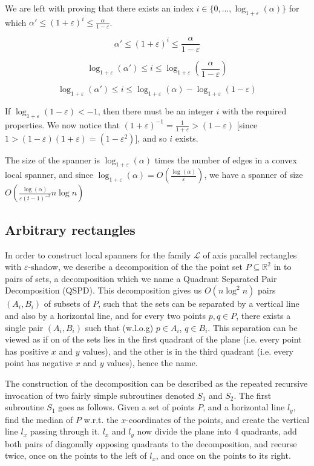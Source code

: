 \documentclass{article}
\newcommand{\eps}{\varepsilon}
\newcommand{\R}{\mathbb{R}}
\newcommand{\LL}{\mathcal{L}}
\begin{document}
	We are left with proving that there exists an index $i\in \{0,...,\log_{1+\eps}(\alpha)\}$ for which $\alpha' \leq (1+\eps)^i \leq \frac{\alpha}{1-\eps}$.
	
	$$\alpha' \leq (1+\eps)^i \leq \frac{\alpha}{1-\eps}$$
	
	$$\log_{1+\eps}(\alpha') \leq i \leq \log_{1+\eps}\left(\frac{\alpha}{1-\eps}\right)$$
	
	$$\log_{1+\eps}(\alpha') \leq i \leq \log_{1+\eps}(\alpha) - \log_{1+\eps}(1-\eps)$$
	
	If $\log_{1+\eps}(1-\eps)<-1$, then there must be an integer $i$ with the required properties. We now notice that $(1+\eps)^{-1}=\frac{1}{1+\eps}>(1-\eps)$ [since $1>(1-\eps)(1+\eps)=(1-\eps^2)$], and so $i$ exists.
	
	The size of the spanner is $\log_{1+\eps}(\alpha)$ times the number of edges in a convex local spanner, and since $\log_{1+\eps}(\alpha)=O\left(\frac{\log(\alpha)}{\eps}\right)$, we have a spanner of size $O\left(\frac{\log(\alpha)}{\eps (t-1)^{-3}}n\log n\right)$
	
	
	\subsection{Arbitrary rectangles}
	
	In order to construct local spanners for the family $\LL$ of axis parallel rectangles with $\eps$-shadow, we describe a decomposition of the the point set $P\subseteq \R^2$ in to pairs of sets, a decomposition which we name a Quadrant Separated Pair Decomposition (QSPD). This decomposition gives us $O(n\log^2n)$ pairs $(A_i,B_i)$ of subsets of $P$, such that the sets can be separated by a vertical line and also by a horizontal line, and for every two points $p,q\in P$, there exists a single pair $(A_i,B_i)$ such that (w.l.o.g) $p\in A_i$, $q\in B_i$. This separation can be viewed as if on of the sets lies in the first quadrant of the plane (i.e. every point has positive $x$ and $y$ values), and the other is in the third quadrant (i.e. every point has negative $x$ and $y$ values), hence the name.
	
	The construction of the decomposition can be described as the repeated recursive invocation of two fairly simple subroutines denoted $S_1$ and $S_2$. The first subroutine $S_1$ goes as follows. Given a set of points $P$, and a horizontal line $l_y$, find the median of $P$ w.r.t. the $x$-coordinates of the points, and create the vertical line $l_x$ passing through it. $l_x$ and $l_y$ now divide the plane into 4 quadrants, add both pairs of diagonally opposing quadrants to the decomposition, and recurse twice, once on the points to the left of $l_x$, and once on the points to its right.
	
\end{document}
